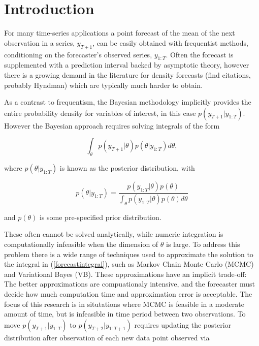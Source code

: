 \documentclass{article}\usepackage[]{graphicx}\usepackage[]{color}
\numberwithin{equation}{section}
\begin{document}
\tableofcontents
\section{Introduction} 

For many time-series applications a point forecast of the mean of the next observation in a series, $y_{T+1}$, can be easily obtained with frequentist methods, conditioning on the forecaster's observed series, $y_{1:T}$. Often the forecast is supplemented with a prediction interval backed by asymptotic theory, however there is a growing demand in the literature for density forecasts (find citations, probably Hyndman) which are typically much harder to obtain. 

As a contrast to frequentism, the Bayesian methodology implicitly provides the entire probability density for variables of interest, in this case $p(y_{T+1} | y_{1:T})$. However the Bayesian approach requires solving integrals of the form 

\begin{equation}
\label{forecastintegral}
\int_\theta p(y_{T+1} | \theta) p(\theta | y_{1:T}) d \theta,
\end{equation}

where $p(\theta | y_{1:T})$ is known as the posterior distribution, with

\begin{equation}
\label{posterior}
 p(\theta | y_{1:T}) = \frac{p(y_{1:T}|\theta)p(\theta)}{\int_\theta p(y_{1:T}|\theta)p(\theta) d\theta}
\end{equation}

and $p(\theta)$ is some pre-specified prior distribution.

These often cannot be solved analytically, while numeric integration is computationally infeasible when the dimension of $\theta$ is large. To address this problem there is a wide range of techniques used to approximate the solution to the integral in (\ref{forecastintegral}), such as Markov Chain Monte Carlo (MCMC) and Variational Bayes (VB). These approximations have an implicit trade-off: The better approximations are compuationaly intensive, and the forecaster must decide how much computation time and approximation error is acceptable. The focus of this research is in situtations where MCMC is feasible in a moderate amount of time, but is infeasible in time period between two observations. To move $p(y_{T+1} | y_{1:T})$ to $p(y_{T+2} | y_{1:T+1})$ requires updating the posterior distribution after observation of each new data point observed via
\end{document}
